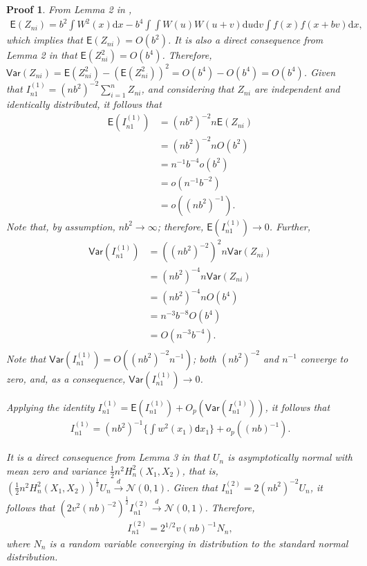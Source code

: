 \documentclass{article}
\newtheorem{Proof}{Proof}[section]
\begin{document}
\begin{Proof}
    From Lemma 2 in \cite{hall1984central},
    \begin{align}
        \mathsf{E} (Z_{ni}) = b^2 \int W^2(x) \mathrm{d}x- b^4 \int \int W(u) W(u+v) \mathrm{d}u \mathrm{d}v \int f(x) f(x+bv) \mathrm{d}x,
    \end{align}
    which implies that $\mathsf{E} (Z_{ni}) =  O(b^2)$. It is also a direct consequence from Lemma 2 in \cite{hall1984central} that $\mathsf{E} (Z_{ni}^2) =  O(b^4)$. Therefore, $\mathsf{Var} (Z_{ni}) = \mathsf{E} (Z_{ni}^2) - (\mathsf{E} (Z_{ni}^2))^2 = O(b^4) - O(b^4) = O(b^4)$. Given that $I_{n1}^{(1)} = (nb^2)^{-2} \sum_{i=1}^{n} Z_{ni}$, and considering that $Z_{ni}$ are independent and identically distributed, it follows that
    \begin{align}
        \mathsf{E} (I_{n1}^{(1)}) &= (nb^2)^{-2} n \mathsf{E} (Z_{ni}) \\
        &= (nb^2)^{-2} n O(b^2) \\
        &= n^{-1} b^{-4} o(b^2) \\
        &= o(n^{-1} b^{-2}) \\
        &= o((nb^2)^{-1}).
    \end{align}
    Note that, by assumption, $nb^2 \to \infty$; therefore, $\mathsf{E} (I_{n1}^{(1)}) \to 0$. Further,
    \begin{align}
        \mathsf{Var} (I_{n1}^{(1)}) &= ((nb^2)^{-2})^2 n \mathsf{Var} (Z_{ni}) \\
        &= (nb^2)^{-4} n \mathsf{Var} (Z_{ni}) \\
        &= (nb^2)^{-4} n O(b^4) \\
        &= n^{-3} b^{-8} O(b^4) \\
        &= O(n^{-3} b^{-4}). \\
    \end{align}
    Note that $\mathsf{Var} (I_{n1}^{(1)}) = O((nb^2)^{-2} n^{-1})$; both $(nb^2)^{-2}$ and $n^{-1}$ converge to zero, and, as a consequence, $\mathsf{Var} (I_{n1}^{(1)}) \to 0$.

    Applying the identity $I_{n1}^{(1)} = \mathsf{E} (I_{n1}^{(1)}) + O_p( \mathsf{Var} (I_{n1}^{(1)}) )$, it follows that
    \begin{align}
        I_{n1}^{(1)} = (nb^2)^{-1} \Bigg\{ \int w^2(x_1) \mathsf{d}x_1\Bigg\} + o_p((nb)^{-1}).
    \end{align}

    It is a direct consequence from Lemma 3 in \cite{hall1984central} that $U_n$ is asymptotically normal with mean zero and variance $\frac{1}{2} n^2 H_n^2(X_1,X_2)$, that is, $(\frac{1}{2} n^2 H_n^2(X_1,X_2))^{\frac{1}{2}} U_n \xrightarrow{d} \mathcal{N}(0, 1)$. Given that $I_{n1}^{(2)} = 2(nb^2)^{-2} U_n$, it follows that $(2v^2 (nb)^{-2})^{\frac{1}{2}} I_{n1}^{(2)} \xrightarrow{d} \mathcal{N}(0, 1)$. Therefore,
    \begin{align}
        I_{n1}^{(2)} = 2^{1/2} v (nb)^{-1} N_n,
    \end{align}
    where $N_n$ is a random variable converging in distribution to the standard normal distribution.
\end{Proof}
\end{document}
